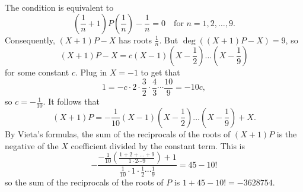 The condition is equivalent to
	\[
		\left(\frac{1}{n}+1\right)P\left(\frac{1}{n}\right)-\frac{1}{n}=0\quad\text{for }n=1,2,\dots,9.
	\]
	Consequently, $(X+1)P-X$ has roots $\frac{1}{n}$. But $\deg((X+1)P-X)=9$, so
	\[
		(X+1)P-X=c(X-1)\left(X-\frac{1}{2}\right)\dots\left(X-\frac{1}{9}\right)
	\]
	for some constant $c$. Plug in $X=-1$ to get that
	\[
		1=-c\cdot2\cdot\frac{3}{2}\cdot\frac{4}{3}\cdots\frac{10}{9}=-10c,
	\]
	so $c=-\frac{1}{10}$. It follows that
	\[
		(X+1)P=-\frac{1}{10}(X-1)\left(X-\frac{1}{2}\right)\dots\left(X-\frac{1}{9}\right)+X.
	\]
	By Vieta's formulas, the sum of the reciprocals of the roots of $(X+1)P$ is the negative of the $X$ coefficient divided by the constant term. This is
	\[
		-\frac{-\frac{1}{10}\left(\frac{1+2+\dots+9}{1\cdot2\cdots9}\right)+1}{\frac{1}{10}\cdot1\cdot\frac{1}{2}\cdots\frac{1}{9}}=45-10!
	\]
	so the sum of the reciprocals of the roots of $P$ is $1+45-10!=-3628754$.
	